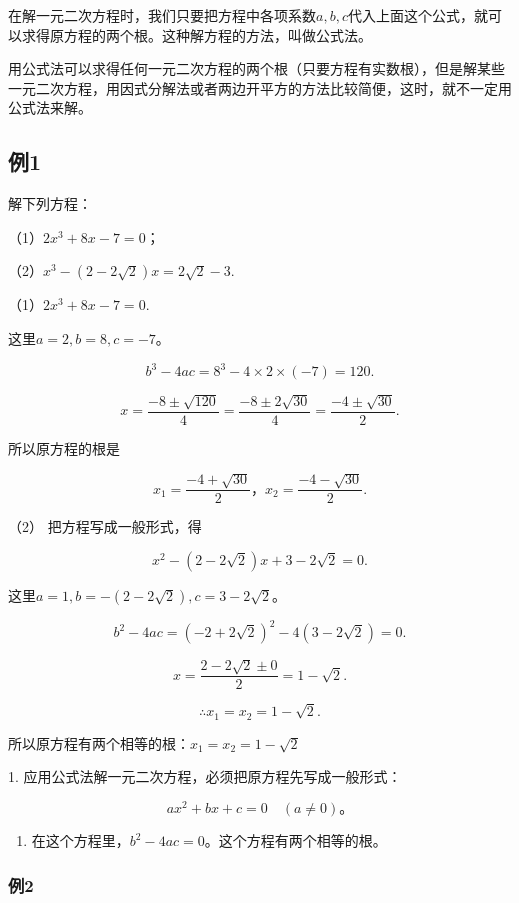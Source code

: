 在解一元二次方程时，我们只要把方程中各项系数\(a, b, c\)代入上面这个公式，就可以求得原方程的两个根。这种解方程的方法，叫做公式法。

用公式法可以求得任何一元二次方程的两个根（只要方程有实数根），但是解某些一元二次方程，用因式分解法或者两边开平方的方法比较简便，这时，就不一定用公式法来解。

\subsection{例1}

解下列方程：

（1）\(2x^{3} + 8x - 7 = 0\)；

（2）\(x^{3} - (2 - 2\sqrt{2})x = 2\sqrt{2} -3.\)

 （1）\(2x^{3} + 8x - 7 = 0.\)

这里\(a = 2, b = 8, c = -7\)。

\[
b ^ {3} - 4 a c = 8 ^ {3} - 4 \times 2 \times (- 7) = 120.
\]

\[
x = \frac{- 8 \pm \sqrt {120}}{4} = \frac{- 8 \pm 2 \sqrt {30}}{4} = \frac{- 4 \pm \sqrt {30}}{2}.
\]

所以原方程的根是

\[
x _ {1} = \frac{- 4 + \sqrt {30}}{2}\text{，} x _ {2} = \frac{- 4 - \sqrt {30}}{2}.
\]

（2） 把方程写成一般形式，得

\[
x ^ {2} - (2 - 2 \sqrt {2}) x + 3 - 2 \sqrt {2} = 0.
\]

这里\(a = 1, b = -(2 - 2\sqrt{2}), c = 3 - 2\sqrt{2}\)。

\[
b ^ {2} - 4 a c = (- 2 + 2 \sqrt {2}) ^ {2} - 4 (3 - 2 \sqrt {2}) = 0.
\]

\[
x = \frac{2 - 2 \sqrt {2} \pm 0}{2} = 1 - \sqrt {2}.
\]

\[
\therefore x _ {1} = x _ {2} = 1 - \sqrt {2}.
\]

所以原方程有两个相等的根：\(x_{1}=x_{2}=1-\sqrt{2}\)

 1.
应用公式法解一元二次方程，必须把原方程先写成一般形式：

\[
a x ^ {2} + b x + c = 0 \quad (a \neq 0)\text{。}
\]

\begin{enumerate}[start=2]
\item
  在这个方程里，\(b^{2}-4ac=0\)。这个方程有两个相等的根。
\end{enumerate}

\subsubsection{例2}

